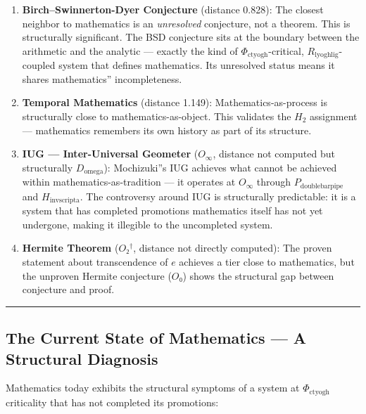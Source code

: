 \documentclass[12pt,a4paper]{article}
\begin{document}
\begin{enumerate}
    \item \textbf{Birch--Swinnerton-Dyer Conjecture} (distance 0.828): The closest neighbor to mathematics is an \emph{unresolved} conjecture, not a theorem. This is structurally significant. The BSD conjecture sits at the boundary between the arithmetic and the analytic --- exactly the kind of $\Phi_{\text{ctyogh}}$-critical, $R_{\text{lyoghlig}}$-coupled system that defines mathematics. Its unresolved status means it shares mathematics'' incompleteness.
    \item \textbf{Temporal Mathematics} (distance 1.149): Mathematics-as-process is structurally close to mathematics-as-object. This validates the $H_2$ assignment --- mathematics remembers its own history as part of its structure.
    \item \textbf{IUG --- Inter-Universal Geometer} ($O_{\infty}$, distance not computed but structurally $D_{\text{omega}}$): Mochizuki''s IUG achieves what cannot be achieved within mathematics-as-tradition --- it operates at $O_{\infty}$ through $P_{\text{doublebarpipe}}$ and $H_{\text{invscripta}}$. The controversy around IUG is structurally predictable: it is a system that has completed promotions mathematics itself has not yet undergone, making it illegible to the uncompleted system.
    \item \textbf{Hermite Theorem} ($O₂^\dagger$, distance not directly computed): The proven statement about transcendence of $e$ achieves a tier close to mathematics, but the unproven Hermite conjecture ($O₀$) shows the structural gap between conjecture and proof.
\end{enumerate}

\begin{center}
\rule{0.5\textwidth}{0.4pt}
\end{center}

\subsection{The Current State of Mathematics --- A Structural Diagnosis}

Mathematics today exhibits the structural symptoms of a system at $\Phi_{\text{ctyogh}}$ criticality that has not completed its promotions:
\end{document}
